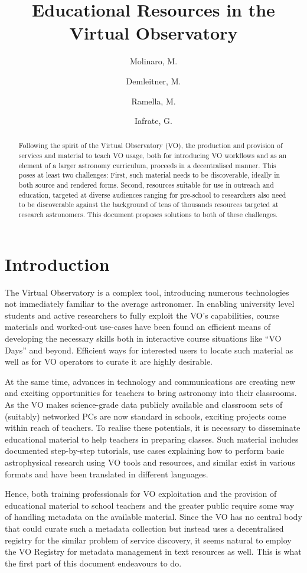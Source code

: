 \documentclass{ivoa}
\author{Molinaro, M.}
\author{Demleitner, M.}
\author{Ramella, M.}
\author{Iafrate, G.}
\title{Educational Resources in the Virtual Observatory}
\begin{document}
\begin{abstract}
Following the spirit of the Virtual Observatory (VO), the production and
provision of services and material to teach VO usage, both for
introducing VO workflows and as an element of a larger astronomy
curriculum, proceeds in a decentralised manner.  This poses at least two
challenges: First, such material needs to be discoverable, ideally in
both source and rendered forms.  Second, resources suitable for use in
outreach and education, targeted at diverse audiences ranging for
pre-school to researchers also need to be discoverable against the
background of tens of thousands resources targeted at research
astronomers.  This document proposes solutions to both of these
challenges.
\end{abstract}


\section{Introduction}

The Virtual Observatory is a complex tool, introducing numerous
technologies not immediately familiar to the average astronomer.
In enabling university level students
and active researchers to fully exploit the VO's capabilities, course
materials and worked-out use-cases have been found an efficient means of
developing the necessary skills both in interactive course situations
like ``VO Days'' and beyond.  
Efficient ways for interested users to locate such
material as well as for VO operators to curate it are highly desirable.

At the same time, advances in technology and 
communications are creating new and exciting 
opportunities for teachers to bring astronomy into their 
classrooms.  As the VO makes science-grade data publicly available and
classroom sets of (suitably) networked PCs are now standard in schools,
exciting projects come within reach of teachers.  To realise these
potentials,
it is necessary to disseminate educational material to help teachers
in preparing classes.  Such material includes documented step-by-step
tutorials, use cases explaining how to perform basic astrophysical research 
using VO tools and resources, and similar exist in various formats and
have been translated in different languages.

Hence, both training professionals for VO exploitation and the provision
of educational material to school teachers and the greater public
require some way of handling metadata on the available material.  Since
the VO has no central body that could curate such a metadata collection
but instead uses a decentralised registry for the similar problem of
service discovery, it seems natural to employ the VO Registry for
metadata management in text resources as well.  This is what the first
part of this document endeavours to do.
\end{document}
